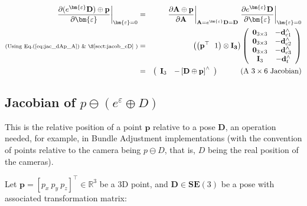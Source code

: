 \documentclass[a4paper,11pt]{report}
\newcommand{\E}{{\bm{\varepsilon}}}
\newcommand{\hatop}[1]{#1^\wedge}
\begin{document}
\begin{eqnarray}
\left. \frac{\partial (e^\E \mathbf{D}) \oplus \mathbf{p} }{\partial \E} \right|_{\E = 0}
&=&
\left. \frac{\partial \mathbf{A} \oplus \mathbf{p}}{\partial \mathbf{A} } \right|_{\mathbf{A}=e^\E \mathbf{D} = \mathbf{D}}
\left. \frac{\partial e^\E \mathbf{D}}{\partial \E} \right|_{\E=0}
\\
\text{\scriptsize{(Using Eq.(\ref{eq:jac_dAp_A}) \& \S\ref{sect:jacob_eD}} )} &=&
\left(\left( \mathbf{p}^\top ~~ 1 \right) \otimes \mathbf{I_3} \right)
\left(
\begin{array}{cc}
 \mathbf{0}_{3\times 3}  & -\hatop{\mathbf{d}}_{c1} \\
 \mathbf{0}_{3\times 3}  & -\hatop{\mathbf{d}}_{c2} \\
 \mathbf{0}_{3\times 3}  & -\hatop{\mathbf{d}}_{c3} \\
 \mathbf{I}_{3}  & -\hatop{\mathbf{d}}_{t} \\
\end{array}
\right)
\\
\label{eq:jacob_eDp_e}
&=&
\left(
\begin{array}{cc}
 \mathbf{I}_3   & - \hatop{ \left[ \mathbf{D} \oplus \mathbf{p} \right]}
\end{array}
\right)
\quad\quad\quad \text{(A $3 \times 6$ Jacobian)}
\end{eqnarray}



\subsection{Jacobian of $p \ominus (e^\varepsilon \oplus D) $}
\label{sect:jacob_eDp_inv}

This is the relative position of a point $\mathbf{p}$ relative to a pose $\mathbf{D}$,
an operation needed, for example, in Bundle Adjustment implementations \cite{triggs2000bundle}
(with the convention of points relative to the camera being $p \ominus D$, that is,
$D$ being the real position of the cameras).

Let $\mathbf{p} = [p_x ~ p_y ~ p_z]^\top \in \mathbb{R}^3$ be a 3D point, and
$\mathbf{D} \in \mathbf{SE}(3)$ be a pose with associated transformation matrix:
\end{document}
